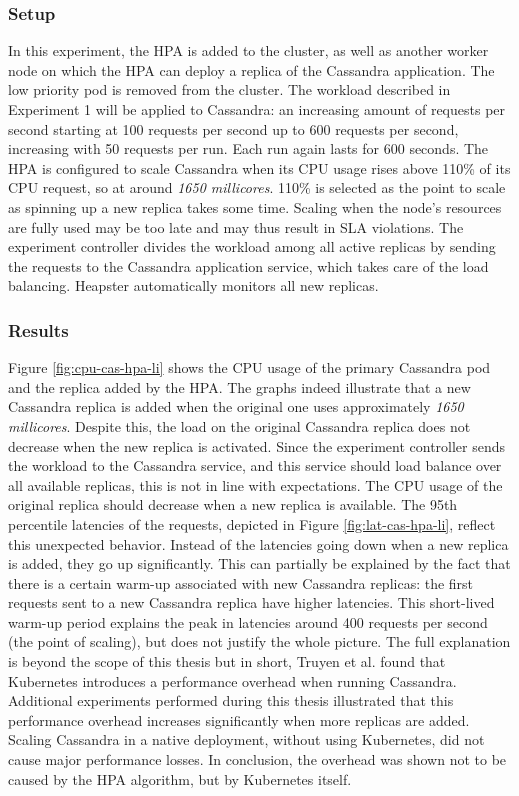 \subsubsection{Setup}
In this experiment, the HPA is added to the cluster, as well as another worker node on which the HPA can deploy a replica of the Cassandra application. The low priority pod is removed from the cluster. The workload described in Experiment 1 will be applied to Cassandra: an increasing amount of requests per second starting at 100 requests per second up to 600 requests per second, increasing with 50 requests per run. Each run again lasts for 600 seconds. The HPA is configured to scale Cassandra when its CPU usage rises above 110\% of its CPU request, so at around \textit{1650 millicores}. 110\% is selected as the point to scale as spinning up a new replica takes some time. Scaling when the node's resources are fully used may be too late and may thus result in SLA violations. The experiment controller divides the workload among all active replicas by sending the requests to the Cassandra application service, which takes care of the load balancing. Heapster automatically monitors all new replicas. 

\subsubsection{Results}
Figure \ref{fig:cpu-cas-hpa-li} shows the CPU usage of the primary Cassandra pod and the replica added by the HPA. The graphs indeed illustrate that a new Cassandra replica is added when the original one uses approximately \textit{1650 millicores}. Despite this, the load on the original Cassandra replica does not decrease when the new replica is activated. Since the experiment controller sends the workload to the Cassandra service, and this service should load balance over all available replicas, this is not in line with expectations. The CPU usage of the original replica should decrease when a new replica is available. The 95th percentile latencies of the requests, depicted in Figure \ref{fig:lat-cas-hpa-li}, reflect this unexpected behavior. Instead of the latencies going down when a new replica is added, they go up significantly. This can partially be explained by the fact that there is a certain warm-up associated with new Cassandra replicas: the first requests sent to a new Cassandra replica have higher latencies. This short-lived warm-up period explains the peak in latencies around 400 requests per second (the point of scaling), but does not justify the whole picture. The full explanation is beyond the scope of this thesis but in short, Truyen et al. \citep{TruyenEddy2019Pooc} found that Kubernetes introduces a performance overhead when running Cassandra. Additional experiments performed during this thesis illustrated that this performance overhead increases significantly when more replicas are added. Scaling Cassandra in a native deployment, without using Kubernetes, did not cause major performance losses. In conclusion, the overhead was shown not to be caused by the HPA algorithm, but by Kubernetes itself.

